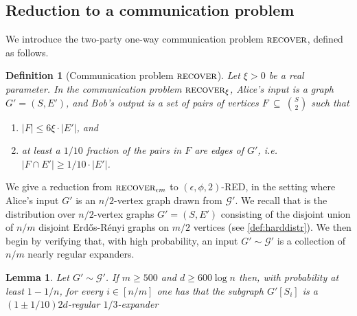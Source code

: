 \documentclass[epsfig,letter,11pt]{article}
\numberwithin{equation}{section}
\DeclareMathOperator*{\er}{ER}
\DeclareMathOperator*{\recover}{\textsc{recover}}
\newtheorem{definition}[theorem]{Definition}
\newtheorem{lemma}[theorem]{Lemma}
\begin{document}
\subsection{Reduction to a communication problem}
\label{subsec:reductioncomm}
We introduce the two-party one-way communication problem $\recover$, defined as follows.
\begin{definition}[Communication problem $\recover$]
	\label{def:recover}
	Let $\xi >0$  be a real parameter. In the communication problem $\recover_{\xi}$,
	Alice's input is a graph $G'=(S,E')$, and Bob's output is a set of pairs of vertices $F~\subseteq~\binom{S}{2}$ such that
	\begin{enumerate}
		\item \label{recover:fsmall} $|F| \le 6 \xi\cdot |E'| $, and
		\item \label{recover:flearns} at least a $1/10$ fraction of the pairs in $F$ are edges of $G'$, i.e. $|F \cap E'| \ge 1/10\cdot |E'|$.
	\end{enumerate}
\end{definition}
\noindent
We give a reduction from $\recover_{\epsilon m}$ to $(\epsilon, \phi,2)$-RED, in the setting where Alice's input $G'$ is an $n/2$-vertex graph drawn from $\mathcal{G}'$. We recall that \smash{$\mathcal{G}'=\mathcal{G}'_{n,d,m} = \er({m}/{2}, 4d/m)^{\otimes n/m}$} is the distribution over $n/2$-vertex graphs $G'=(S,E')$ consisting of the disjoint union of $n/m$ disjoint Erd\H{o}s-R\'{e}nyi graphs on $m/2$ vertices (see \cref{def:harddistr}). We then begin by verifying that, with high probability, an input $G' \sim \mathcal{G}'$ is a collection of $n/m$ nearly regular expanders.

\begin{lemma} \label{lem:leftexpander}
	Let $G' \sim \mathcal{G}'$. If $m\ge 500$ and $d \ge 600 \log n$ then,  with probability at least $1-1/n$, for every $i \in [n/m]$ one has that the subgraph $G'[S_i]$ is a $(1 \pm 1/10)2d$-regular $1/3$-expander
\end{lemma}
\end{document}
